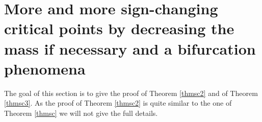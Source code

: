 \documentclass[10pt,a4paper]{article}
\newtheorem{remark}[theorem]{Remark}
\theoremstyle{definition} \theoremstyle{remark}
\numberwithin{equation}{section}
\newcommand{\G}{\mathcal{G}}
\newcommand{\B}{\mathcal{B}}
\newcommand{\kc}{\mathfrak{c}}
\newcommand{\Ga}{\Gamma}
\begin{document}


\section{More and more sign-changing critical points by decreasing the mass if necessary and a bifurcation phenomena} \label{secproof2}

The goal of this section is to give the proof of Theorem \ref{thmsc2} and of Theorem \ref{thmsc3}. As the proof of Theorem \ref{thmsc2} is quite similar to the one of Theorem \ref{thmsc} we will not give the full details.
\end{document}
